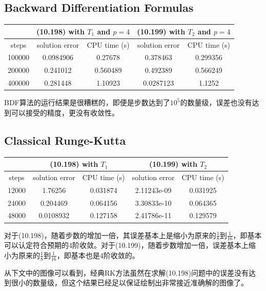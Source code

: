 \documentclass[a4paper,11.5pt,UTF8]{ctexart}
\begin{document}
\begin{large}
\subsection{Backward Differentiation Formulas}
\begin{center}
\begin{tabular}{|c|c|c|c|c|}
    \hline
     & \multicolumn{2}{c|}{(10.198) with $T_1$ and $p=4$} & \multicolumn{2}{c|}{(10.199) with $T_2$ and $p=4$} \\
     \hline
     steps & solution error & CPU time (s) & solution error & CPU time (s) \\
     \hline
     100000 & 0.0984906 & 0.27678 & 0.378463 & 0.299356 \\
     \hline
     200000 & 0.241012 & 0.560489 & 0.492389 & 0.566249 \\
     \hline
     400000 & 0.281448 & 1.10923 & 0.0287123 & 1.1252 \\
     \hline
\end{tabular}
\end{center}
\par BDF算法的运行结果是很糟糕的，即便是步数达到了$10^5$的数量级，误差也没有达到可以接受的精度，更没有收敛性。

\subsection{Classical Runge-Kutta}
\begin{center}
\begin{tabular}{|c|c|c|c|c|}
    \hline
     & \multicolumn{2}{c|}{(10.198) with $T_1$} & \multicolumn{2}{c|}{(10.199) with $T_2$} \\
     \hline
     steps & solution error & CPU time (s) & solution error & CPU time (s) \\
     \hline
     12000 & 1.76256 & 0.031874 & 2.11243e-09 & 0.031925 \\
     \hline
     24000 & 0.204469 & 0.064156 & 3.30833e-10 & 0.064365 \\
     \hline
     48000 & 0.0108932 & 0.127158 & 2.41786e-11 & 0.129579 \\
     \hline
\end{tabular}
\end{center}
\par 对于(10.198)，随着步数的增加一倍，其误差基本上是缩小为原来的$\frac{1}{8}\text{到}\frac{1}{16}$，即基本可以认定符合预期的4阶收敛。对于(10.199)，随着步数增加一倍，误差基本上缩小为原来的$\frac{1}{8}\text{到}\frac{1}{16}$，即基本也是4阶收敛的。
\par 从下文中的图像可以看到，经典RK方法虽然在求解(10.198)问题中的误差没有达到很小的数量级，但这个结果已经足以保证绘制出非常接近准确解的图像了。


\end{large}
\end{document}
